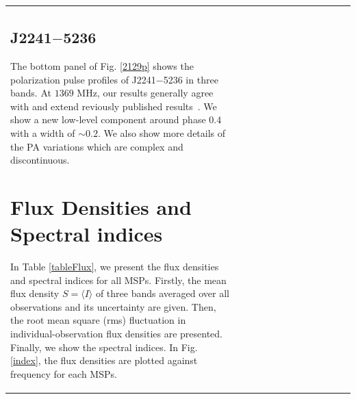 \documentclass[useAMS,usenatbib]{mn2e}
\begin{document}
\begin{table}
\begin{center}
\begin{tabular}{lcccccccccccc}

\subsection{J2241$-$5236}

The bottom panel of Fig. \ref{2129p} shows the polarization pulse profiles of 
J2241$-$5236 
in three bands.
%
At $1369$ MHz, our results generally agree with and extend reviously published results~\citep{Keith11}.
%
We show a new low-level component around phase $0.4$ with a width of $\sim 0.2$.
%
We also show more details of the PA variations which are complex and discontinuous.
%



\section{Flux Densities and Spectral indices}

In Table \ref{tableFlux}, we present the flux densities and spectral indices 
for all MSPs.
%
Firstly, the mean flux density $S=\langle I\rangle$ of three bands averaged over all 
observations and its uncertainty are given. 
%
Then, the root mean square (rms) fluctuation in individual-observation flux 
densities are presented. Finally, we show the spectral indices.
%
In Fig. \ref{index}, the flux densities are plotted against frequency for each 
MSPs.
%


\end{tabular}
\end{center}
\end{table}
\end{document}
